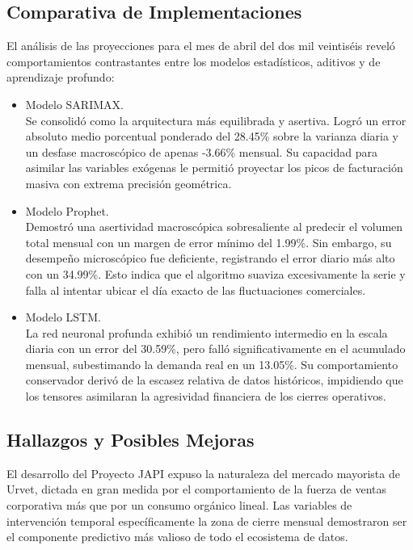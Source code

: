 \documentclass[11pt,a4paper]{report}
\begin{document}
    \subsection{Comparativa de Implementaciones}
    El análisis de las proyecciones para el mes de abril del dos mil veintiséis reveló comportamientos contrastantes entre
    los modelos estadísticos, aditivos y de aprendizaje profundo:
    \begin{itemize}
        \item Modelo SARIMAX.\\
        Se consolidó como la arquitectura más equilibrada y asertiva. Logró un error absoluto medio porcentual ponderado del
        28.45\% sobre la varianza diaria y un desfase macroscópico de apenas -3.66\% mensual. Su capacidad para asimilar las variables exógenas le
        permitió proyectar los picos de facturación masiva con extrema precisión geométrica.

        \item Modelo Prophet.\\
        Demostró una asertividad macroscópica sobresaliente al predecir el volumen total mensual con un margen de error mínimo
        del 1.99\%. Sin embargo, su desempeño microscópico fue deficiente, registrando el error diario más alto con un 34.99\%.
        Esto indica que el algoritmo suaviza excesivamente la serie y falla al intentar ubicar el día exacto de las fluctuaciones comerciales.

        \item Modelo LSTM.\\
        La red neuronal profunda exhibió un rendimiento intermedio en la escala diaria con un error del 30.59\%, pero falló significativamente en el
        acumulado mensual, subestimando la demanda real en un 13.05\%. Su comportamiento conservador derivó de la escasez relativa de datos históricos,
        impidiendo que los tensores asimilaran la agresividad financiera de los cierres operativos.

    \end{itemize}

    \subsection{Hallazgos y Posibles Mejoras}
    El desarrollo del Proyecto JAPI expuso la naturaleza del mercado mayorista de Urvet, dictada en gran medida por el
    comportamiento de la fuerza de ventas corporativa más que por un consumo orgánico lineal. Las variables de intervención temporal
    específicamente la zona de cierre mensual demostraron ser el componente predictivo más valioso de todo el ecosistema de datos.
\end{document}
